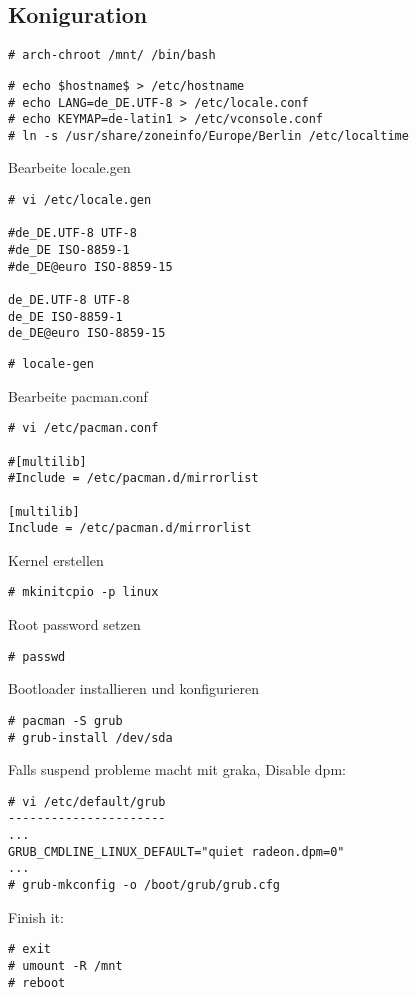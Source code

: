 \subsection{Koniguration}
\label{subsec:config}
\begin{lstlisting}[style=Bash]
# arch-chroot /mnt/ /bin/bash
\end{lstlisting}
\begin{lstlisting}[style=Bash]
# echo $hostname$ > /etc/hostname
# echo LANG=de_DE.UTF-8 > /etc/locale.conf
# echo KEYMAP=de-latin1 > /etc/vconsole.conf
# ln -s /usr/share/zoneinfo/Europe/Berlin /etc/localtime
\end{lstlisting}
Bearbeite locale.gen
\begin{lstlisting}[style=Bash]
# vi /etc/locale.gen

#de_DE.UTF-8 UTF-8
#de_DE ISO-8859-1
#de_DE@euro ISO-8859-15

de_DE.UTF-8 UTF-8
de_DE ISO-8859-1
de_DE@euro ISO-8859-15
\end{lstlisting}
\begin{lstlisting}[style=Bash]
# locale-gen 
\end{lstlisting}
Bearbeite pacman.conf
\begin{lstlisting}[style=Bash]
# vi /etc/pacman.conf

#[multilib]
#Include = /etc/pacman.d/mirrorlist

[multilib]
Include = /etc/pacman.d/mirrorlist
\end{lstlisting}
Kernel erstellen
\begin{lstlisting}[style=Bash]
# mkinitcpio -p linux
\end{lstlisting}
Root password setzen 
\begin{lstlisting}[style=Bash]
# passwd
\end{lstlisting}
Bootloader installieren und konfigurieren
\begin{lstlisting}[style=Bash]
# pacman -S grub 
# grub-install /dev/sda 
\end{lstlisting}
Falls suspend probleme macht mit graka, Disable dpm:
\begin{lstlisting}[style=Bash]
# vi /etc/default/grub
----------------------
...
GRUB_CMDLINE_LINUX_DEFAULT="quiet radeon.dpm=0"
...
# grub-mkconfig -o /boot/grub/grub.cfg 
\end{lstlisting}
Finish it:
\begin{lstlisting}[style=Bash]
# exit 
# umount -R /mnt
# reboot 
\end{lstlisting}

